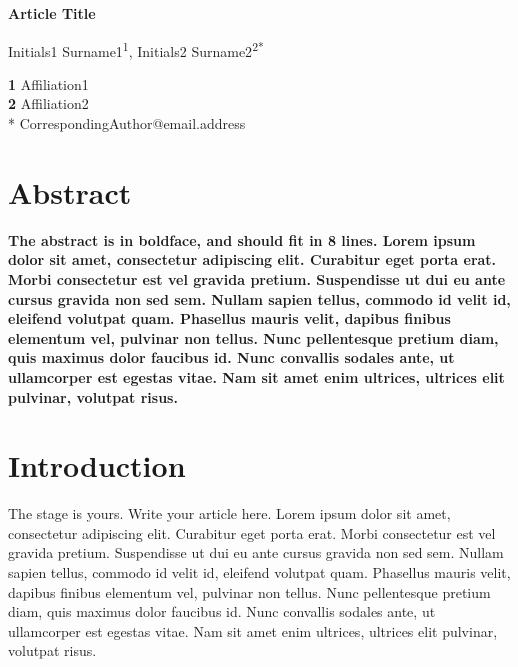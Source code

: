 \documentclass[10pt]{article}
\begin{document}
\begin{center}
{\Large
\textbf{Article Title}
}
\end{center}

\begin{center}
Initials1 Surname1\textsuperscript{1},
Initials2 Surname2\textsuperscript{2*}
\end{center}

\begin{center}
{\bf 1} Affiliation1
\\
{\bf 2} Affiliation2
\\
* CorrespondingAuthor@email.address
\bigskip
\end{center}

\linenumbers


\section*{Abstract}
{\bf 
The abstract is in boldface, and should fit in 8 lines.
Lorem ipsum dolor sit amet, consectetur adipiscing elit. Curabitur eget porta erat. Morbi consectetur est vel gravida pretium. Suspendisse ut dui eu ante cursus gravida non sed sem. Nullam sapien tellus, commodo id velit id, eleifend volutpat quam. Phasellus mauris velit, dapibus finibus elementum vel, pulvinar non tellus. Nunc pellentesque pretium diam, quis maximus dolor faucibus id. Nunc convallis sodales ante, ut ullamcorper est egestas vitae. Nam sit amet enim ultrices, ultrices elit pulvinar, volutpat risus.
}

\section{Introduction}
The stage is yours. Write your article here.
Lorem ipsum dolor sit amet\cite{Cite1}, consectetur adipiscing elit. Curabitur eget porta erat. Morbi consectetur est vel gravida pretium. Suspendisse ut dui eu ante cursus gravida non sed sem. Nullam sapien tellus, commodo id velit id, eleifend volutpat quam. Phasellus mauris velit, dapibus finibus elementum vel, pulvinar non tellus. Nunc pellentesque pretium diam, quis maximus dolor faucibus id. Nunc convallis sodales ante, ut ullamcorper est egestas vitae. Nam sit amet enim ultrices, ultrices elit pulvinar, volutpat risus.
\end{document}
